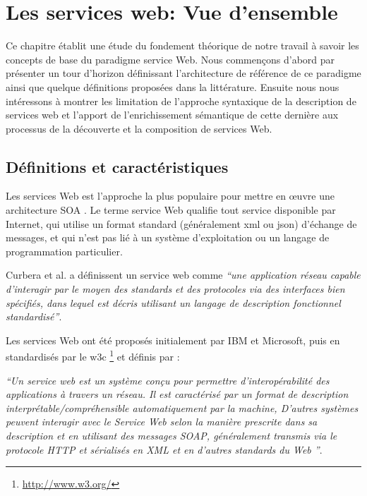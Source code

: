 \chapter{Les services web: Vue d'ensemble}
Ce chapitre établit une étude du fondement théorique de notre travail
à savoir les concepts de base du paradigme service Web.  Nous
commençons d'abord par présenter un tour d'horizon définissant
l'architecture de référence de ce paradigme ainsi que quelque
définitions proposées dans la littérature. Ensuite nous nous
intéressons à montrer les limitation de l'approche syntaxique de la
description de services web et l'apport de l'enrichissement
sémantique de cette dernière aux processus de la découverte et la
composition de services Web.

\newpage
\section{Définitions et caractéristiques}
\label{sec:ws-notions-de-base}

Les services Web est l'approche la plus populaire pour mettre en œuvre
une architecture SOA . Le terme service Web qualifie tout service
disponible par Internet, qui utilise un format standard (généralement
\acrshort{xml} ou \acrshort{json}) d'échange de messages, et qui n'est
pas lié à un système d'exploitation ou un langage de programmation
particulier.

\label{sec:ws-definition}
Curbera et al. \cite{curbera2001web} a définissent un service web
comme \emph{``une application réseau capable d'interagir par le moyen
  des standards et des protocoles via des interfaces bien spécifiés,
  dans lequel est décris utilisant un langage de description
  fonctionnel standardisé''}.

Les services Web ont été proposés initialement par IBM
\cite{kreger2001web} et Microsoft, puis en standardisés par le
\acrshort{w3c} \footnote{\url{http://www.w3.org/}} et définis
\cite{WSA} par :

\emph{``Un service web est un système conçu pour permettre
  d'interopérabilité des applications à travers un réseau.  Il est
  caractérisé par un format de description
  interprétable/compréhensible automatiquement par la machine,
  D'autres systèmes peuvent interagir avec le Service Web selon la
  manière prescrite dans sa description et en utilisant des messages
  SOAP, généralement transmis via le protocole HTTP et sérialisés en
  XML et en d'autres standards du Web ''}.

